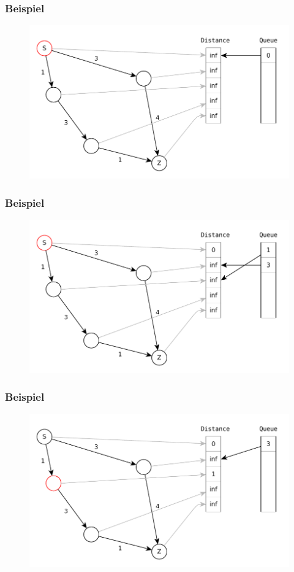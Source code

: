 \begin{frame}
\frametitle{Beispiel}
\begin{figure}
\includegraphics[scale=.8]{dijkstra_graphs/dijkstra_1.pdf}
\end{figure}
\end{frame}

\begin{frame}
\frametitle{Beispiel}
\begin{figure}
\includegraphics[scale=.8]{dijkstra_graphs/dijkstra_2.pdf}
\end{figure}
\end{frame}

\begin{frame}
\frametitle{Beispiel}
\begin{figure}
\includegraphics[scale=.8]{dijkstra_graphs/dijkstra_3.pdf}
\end{figure}
\end{frame}

